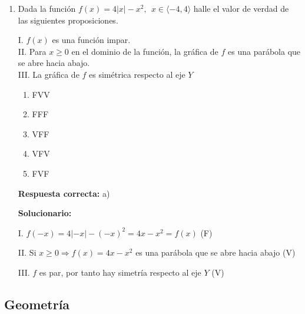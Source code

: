 \begin{enumerate}[resume]
	\item Dada la función $f(x)=4|x|-x^2,\ \ x\in\langle -4,4\rangle$ halle el valor de verdad de las siguientes proposiciones.
	
	I. $f(x)$ es una función impar.\\
	II. Para $x\geq 0$ en el dominio de la función, la gráfica de $f$ es una parábola que se abre hacia abajo.\\
	III. La gráfica de $f$ es simétrica respecto al eje $Y$
	
	\begin{enumerate}[label=\alph*)]
		\item FVV
		\item FFF
		\item VFF
		\item VFV
		\item FVF
	\end{enumerate}
	\textbf{Respuesta correcta:} a)
	
	\vspace{2mm}
	\textbf{Solucionario:}
	
	I. $f(-x)=4|-x|-(-x)^2=4x-x^2=f(x)$ \hfill (F)
	
	II. Si $x\geq 0 \Rightarrow f(x)=4x-x^2$ es una parábola que se abre hacia abajo \hfill (V)
	
	III. $f$ es par, por tanto hay simetría respecto al eje $Y$ \hfill (V)
	
	\vspace{6mm}
	
\end{enumerate}






\subsection*{Geometría}


